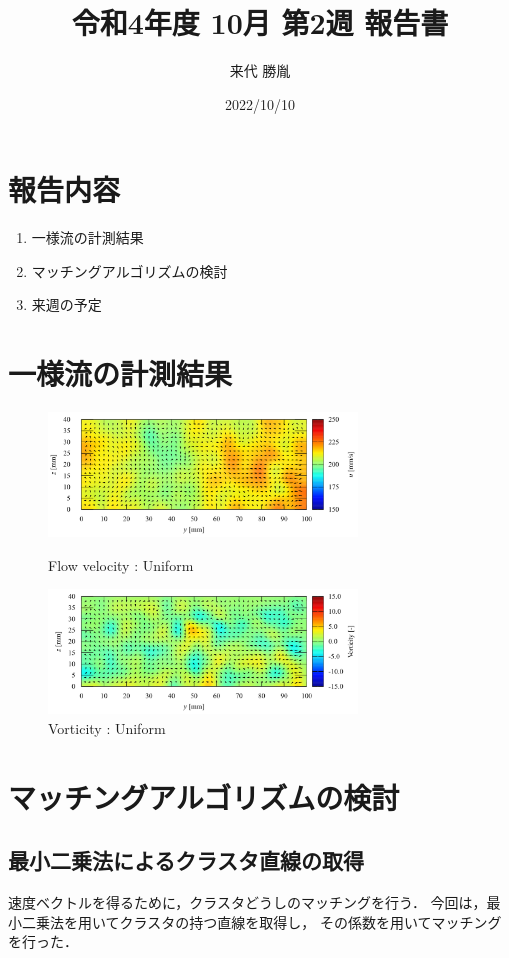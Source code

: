 \documentclass[twocolumn,a4j]{jsarticle}
\author{来代 勝胤}
\title{令和4年度 10月 第2週 報告書}
\date{2022/10/10}
\begin{document}
\columnseprule=0.1mm
\maketitle

\section*{報告内容}
\begin{enumerate}[1.]
  \item 一様流の計測結果
  \item マッチングアルゴリズムの検討
  \item 来週の予定
\end{enumerate}

\section{一様流の計測結果}
\begin{figure}[htbp]
  \centering
  \includegraphics[keepaspectratio, width=82mm]{../images/uniform_velocity.png}
  \caption{Flow velocity : Uniform}
  \includegraphics[keepaspectratio, width=82mm]{../images/uniform_vorticity.png}
  \caption{Vorticity : Uniform}
\end{figure}

\section{マッチングアルゴリズムの検討}
\subsection{最小二乗法によるクラスタ直線の取得}
速度ベクトルを得るために，クラスタどうしのマッチングを行う．
今回は，最小二乗法を用いてクラスタの持つ直線を取得し，
その係数を用いてマッチングを行った．
\end{document}
